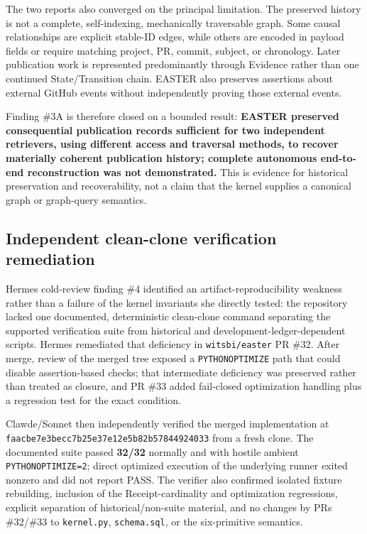 \documentclass[11pt]{article}
\begin{document}
The two reports also converged on the principal limitation. The preserved history is not a complete, self-indexing, mechanically traversable graph. Some causal relationships are explicit stable-ID edges, while others are encoded in payload fields or require matching project, PR, commit, subject, or chronology. Later publication work is represented predominantly through Evidence rather than one continued State/Transition chain. EASTER also preserves assertions about external GitHub events without independently proving those external events.

Finding \#3A is therefore closed on a bounded result: \textbf{EASTER preserved consequential publication records sufficient for two independent retrievers, using different access and traversal methods, to recover materially coherent publication history; complete autonomous end-to-end reconstruction was not demonstrated.} This is evidence for historical preservation and recoverability, not a claim that the kernel supplies a canonical graph or graph-query semantics.

\subsection{Independent clean-clone verification remediation}

Hermes cold-review finding \#4 identified an artifact-reproducibility weakness rather than a failure of the kernel invariants she directly tested: the repository lacked one documented, deterministic clean-clone command separating the supported verification suite from historical and development-ledger-dependent scripts. Hermes remediated that deficiency in \texttt{witsbi/easter} PR \#32. After merge, review of the merged tree exposed a \texttt{PYTHONOPTIMIZE} path that could disable assertion-based checks; that intermediate deficiency was preserved rather than treated as closure, and PR \#33 added fail-closed optimization handling plus a regression test for the exact condition.

Clawde/Sonnet then independently verified the merged implementation at \texttt{faacbe7e3becc7b25e37e12e5b82b57844924033} from a fresh clone. The documented suite passed \textbf{32/32} normally and with hostile ambient \texttt{PYTHONOPTIMIZE=2}; direct optimized execution of the underlying runner exited nonzero and did not report PASS. The verifier also confirmed isolated fixture rebuilding, inclusion of the Receipt-cardinality and optimization regressions, explicit separation of historical/non-suite material, and no changes by PRs \#32/\#33 to \texttt{kernel.py}, \texttt{schema.sql}, or the six-primitive semantics.
\end{document}
